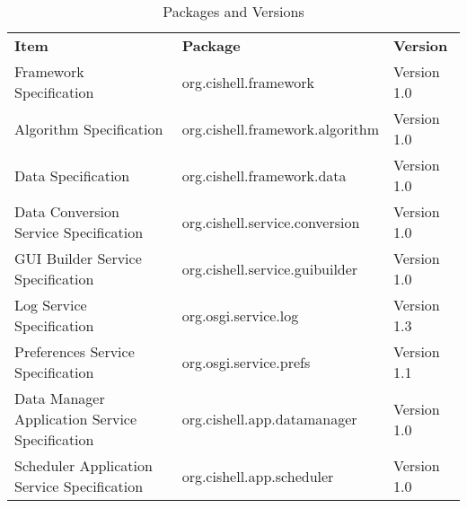 \begin{table}[h!]
\begin{tabular}{l l l}
\textbf{Item} & \textbf{Package} & \textbf{Version} \\
Framework Specification & org.cishell.framework & Version 1.0 \\
Algorithm Specification & org.cishell.framework.algorithm & Version 1.0 \\
Data Specification & org.cishell.framework.data & Version 1.0 \\
Data Conversion Service Specification & org.cishell.service.conversion &
Version 1.0 \\
GUI Builder Service Specification & org.cishell.service.guibuilder & Version
1.0 \\
Log Service Specification & org.osgi.service.log & Version 1.3 \\
Preferences Service Specification & org.osgi.service.prefs & Version 1.1 \\
Data Manager Application Service Specification & org.cishell.app.datamanager &
Version 1.0 \\
Scheduler Application Service Specification & org.cishell.app.scheduler &
Version 1.0 \\
\end{tabular}
\caption{Packages and Versions}
\label{table:packageVersions}
\end{table}